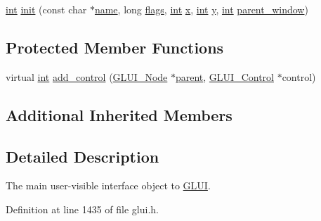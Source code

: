 \begin{DoxyCompactItemize}
\item 
\hyperlink{wglext_8h_a500a82aecba06f4550f6849b8099ca21}{int} \hyperlink{class_g_l_u_i_a130870067b12b7228da501dae36be013}{init} (const char $\ast$\hyperlink{glext_8h_ad977737dfc9a274a62741b9500c49a32}{name}, long \hyperlink{glext_8h_aa9459b47e7388437191d2d9a69c10d98}{flags}, \hyperlink{wglext_8h_a500a82aecba06f4550f6849b8099ca21}{int} \hyperlink{glext_8h_ad77deca22f617d3f0e0eb786445689fc}{x}, \hyperlink{wglext_8h_a500a82aecba06f4550f6849b8099ca21}{int} \hyperlink{glext_8h_a9298c7ad619074f5285b32c6b72bfdea}{y}, \hyperlink{wglext_8h_a500a82aecba06f4550f6849b8099ca21}{int} \hyperlink{class_g_l_u_i___main_a70e6e1ec266281f272954fcc42f85087}{parent\+\_\+window})
\end{DoxyCompactItemize}
\subsection*{Protected Member Functions}
\begin{DoxyCompactItemize}
\item 
virtual \hyperlink{wglext_8h_a500a82aecba06f4550f6849b8099ca21}{int} \hyperlink{class_g_l_u_i_a293fdf48459c281e466781ec9c559c21}{add\+\_\+control} (\hyperlink{class_g_l_u_i___node}{G\+L\+U\+I\+\_\+\+Node} $\ast$\hyperlink{class_g_l_u_i___node_a8ed65d447784f6f88bd3e2e2bcac6cdb}{parent}, \hyperlink{class_g_l_u_i___control}{G\+L\+U\+I\+\_\+\+Control} $\ast$control)
\end{DoxyCompactItemize}
\subsection*{Additional Inherited Members}


\subsection{Detailed Description}
The main user-\/visible interface object to \hyperlink{class_g_l_u_i}{G\+L\+U\+I}. 

Definition at line 1435 of file glui.\+h.



